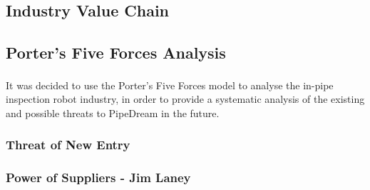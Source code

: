 \documentclass[11pt]{article}		%
\newcommand{\supercite}[1]{\textsuperscript{\cite{#1}}}		%
\begin{document}
		\subsection[Industry Value Chain]{Industry Value Chain}
		
		\subsection{Porter's Five Forces Analysis}
			
			It was decided to use the Porter's Five Forces model\supercite{porter2008five} to analyse the in-pipe inspection robot industry, in order to provide a systematic analysis of the existing and possible threats to PipeDream in the future.
		
			\subsubsection{Threat of New Entry}
					
			\subsubsection{Power of Suppliers - Jim Laney}
				
\end{document}
